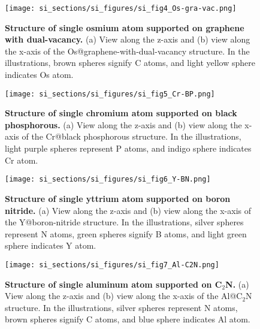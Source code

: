 \begin{figure}
  \centering
  \texttt{[image: si\_sections/si\_figures/si\_fig4\_Os-gra-vac.png]}
  \caption{\textbf{Structure of single osmium atom supported on graphene with dual-vacancy.}
  (a) View along the z-axis and (b) view along the x-axis of the Os@graphene-with-dual-vacancy structure.
  In the illustrations, brown spheres signify C atoms, and light yellow sphere indicates Os atom.}
  \label{si_fig4:Os-gra-vac}
\end{figure}


\begin{figure}
  \centering
  \texttt{[image: si\_sections/si\_figures/si\_fig5\_Cr-BP.png]}
  \caption{\textbf{Structure of single chromium atom supported on black phosphorous.}
  (a) View along the z-axis and (b) view along the x-axis of the Cr@black phosphorous structure.
  In the illustrations, light purple spheres represent P atoms, and indigo sphere indicates Cr atom.}
  \label{si_fig5:Cr-BP}
\end{figure}


\begin{figure}
  \centering
  \texttt{[image: si\_sections/si\_figures/si\_fig6\_Y-BN.png]}
  \caption{\textbf{Structure of single yttrium atom supported on boron nitride.}
  (a) View along the z-axis and (b) view along the x-axis of the Y@boron-nitride structure.
  In the illustrations, silver spheres represent N atoms, green spheres signify B atoms,
  and light green sphere indicates Y atom.}
  \label{si_fig6:Y-BN}
\end{figure}


\begin{figure}
  \centering
  \texttt{[image: si\_sections/si\_figures/si\_fig7\_Al-C2N.png]}
  \caption{\textbf{Structure of single aluminum atom supported on C$_2$N.}
  (a) View along the z-axis and (b) view along the x-axis of the Al@C$_2$N structure.
  In the illustrations, silver spheres represent N atoms, brown spheres signify C atoms,
  and blue sphere indicates Al atom.}
  \label{si_fig7:Al-C2N}
\end{figure}



